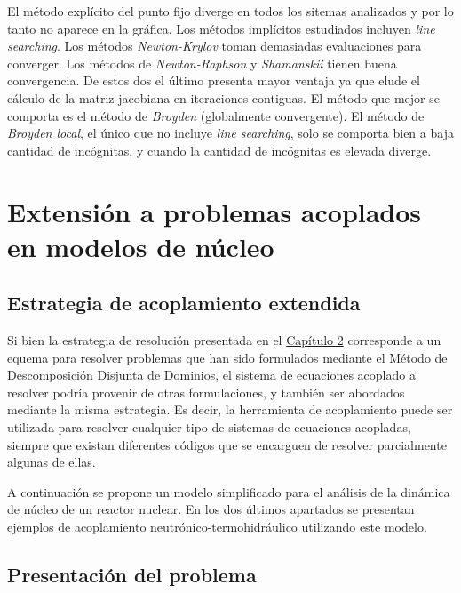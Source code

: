 El método explícito del punto fijo diverge en todos los sitemas analizados y por lo tanto no aparece en la gráfica.
Los métodos implícitos estudiados incluyen \textit{line searching}.
Los métodos \textit{Newton-Krylov} toman demasiadas evaluaciones para converger.
Los métodos de \textit{Newton-Raphson} y \textit{Shamanskii} tienen buena convergencia.
De estos dos el último presenta mayor ventaja ya que elude el cálculo de la matriz jacobiana en iteraciones contiguas.
El método que mejor se comporta es el método de \textit{Broyden} (globalmente convergente).
El método de \textit{Broyden local}, el único que no incluye \textit{line searching},
solo se comporta bien a baja cantidad de incógnitas, y cuando la cantidad de incógnitas es elevada diverge.

\section{Extensión a problemas acoplados en modelos de núcleo}
\label{3:extension-nucleo}

\subsection*{Estrategia de acoplamiento extendida}
\label{3:strategy-extended}

Si bien la estrategia de resolución presentada en el \hyperlink{chapter.2}{Capítulo 2}
corresponde a un equema para resolver problemas que han sido formulados mediante el Método de Descomposición Disjunta de Dominios,
el sistema de ecuaciones acoplado a resolver podría provenir de otras formulaciones,
y también ser abordados mediante la misma estrategia.
Es decir, la herramienta de acoplamiento puede ser utilizada para resolver cualquier tipo de sistemas de ecuaciones acopladas,
siempre que existan diferentes códigos que se encarguen de resolver parcialmente algunas de ellas.

A continuación se propone un modelo simplificado para el análisis de la dinámica de núcleo de un reactor nuclear.
En los dos últimos apartados se presentan ejemplos de acoplamiento neutrónico-termohidráulico utilizando este modelo.

\subsection*{Presentación del problema}
\label{3:neut-th}

